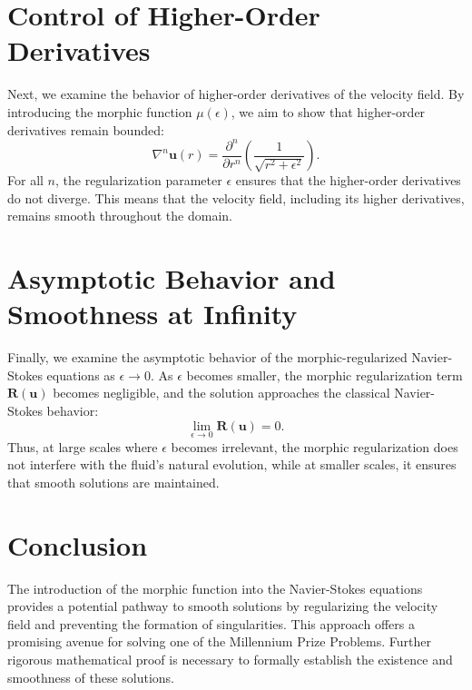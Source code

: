 \documentclass{article}
\begin{document}
\section{Control of Higher-Order Derivatives}

Next, we examine the behavior of higher-order derivatives of the velocity field. By introducing the morphic function \( \mu(\epsilon) \), we aim to show that higher-order derivatives remain bounded:
\[
\nabla^n \mathbf{u}(r) = \frac{\partial^n}{\partial r^n} \left( \frac{1}{\sqrt{r^2 + \epsilon^2}} \right).
\]
For all \( n \), the regularization parameter \( \epsilon \) ensures that the higher-order derivatives do not diverge. This means that the velocity field, including its higher derivatives, remains smooth throughout the domain.

\section{Asymptotic Behavior and Smoothness at Infinity}

Finally, we examine the asymptotic behavior of the morphic-regularized Navier-Stokes equations as \( \epsilon \to 0 \). As \( \epsilon \) becomes smaller, the morphic regularization term \( \mathbf{R}(\mathbf{u}) \) becomes negligible, and the solution approaches the classical Navier-Stokes behavior:
\[
\lim_{\epsilon \to 0} \mathbf{R}(\mathbf{u}) = 0.
\]
Thus, at large scales where \( \epsilon \) becomes irrelevant, the morphic regularization does not interfere with the fluid's natural evolution, while at smaller scales, it ensures that smooth solutions are maintained.

\section{Conclusion}

The introduction of the morphic function into the Navier-Stokes equations provides a potential pathway to smooth solutions by regularizing the velocity field and preventing the formation of singularities. This approach offers a promising avenue for solving one of the Millennium Prize Problems. Further rigorous mathematical proof is necessary to formally establish the existence and smoothness of these solutions.
\end{document}
